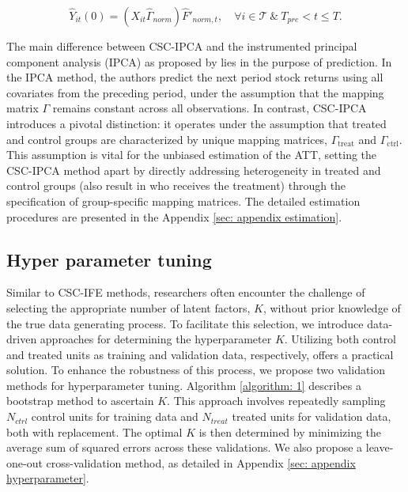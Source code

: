 \documentclass[12pt]{article}
\begin{document}
\begin{equation}
\hat{Y}_{it}(0) = (X_{it} \hat{\Gamma}_{norm}) \hat{F}'_{norm, t}, \quad \forall i \in \mathcal{T} \ \& \ T_{pre} < t \leq T.
\end{equation}

The main difference between CSC-IPCA and the instrumented principal component analysis (IPCA) as proposed by \cite{kelly2020instrumented} lies in the purpose of prediction. In the IPCA method, the authors predict the next period stock returns using all covariates from the preceding period, under the assumption that the mapping matrix $\Gamma$ remains constant across all observations. In contrast, CSC-IPCA introduces a pivotal distinction: it operates under the assumption that treated and control groups are characterized by unique mapping matrices, $\Gamma_{\text{treat}}$ and $\Gamma_{\text{ctrl}}$. This assumption is vital for the unbiased estimation of the ATT, setting the CSC-IPCA method apart by directly addressing heterogeneity in treated and control groups (also result in who receives the treatment) through the specification of group-specific mapping matrices. The detailed estimation procedures are presented in the Appendix \ref{sec: appendix estimation}.

\subsection{Hyper parameter tuning} 
\label{sec: hyperparameter}
Similar to CSC-IFE methods, researchers often encounter the challenge of selecting the appropriate number of latent factors, $K$, without prior knowledge of the true data generating process. To facilitate this selection, we introduce data-driven approaches for determining the hyperparameter $K$. Utilizing both control and treated units as training and validation data, respectively, offers a practical solution. To enhance the robustness of this process, we propose two validation methods for hyperparameter tuning. Algorithm \ref{algorithm: 1} describes a bootstrap method to ascertain $K$. This approach involves repeatedly sampling $N_{ctrl}$ control units for training data and $N_{treat}$ treated units for validation data, both with replacement. The optimal $K$ is then determined by minimizing the average sum of squared errors across these validations. We also propose a leave-one-out cross-validation method, as detailed in Appendix \ref{sec: appendix hyperparameter}.
\end{document}
